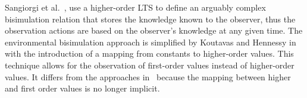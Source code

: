 

Sangiorgi et al.~\cite{DBLP:conf/lics/SangiorgiKS07}, use a higher-order LTS 
to define an arguably complex bisimulation relation that stores the knowledge known to
the observer, thus the observation actions are based on the observer's knowledge
at any given time. 
The environmental bisimulation approach is simplified by Koutavas and
Hennessy in~\cite{DBLP:journals/cl/KoutavasH12,DBLP:conf/esop/KoutavasH11}
with the introduction
of a mapping from constants to higher-order values. This
technique allows for the observation of first-order values instead
of higher-order values. It differs from the approaches
in~\cite{San96H,JeffreyR05} because the
mapping between higher and first order values is no longer implicit.





